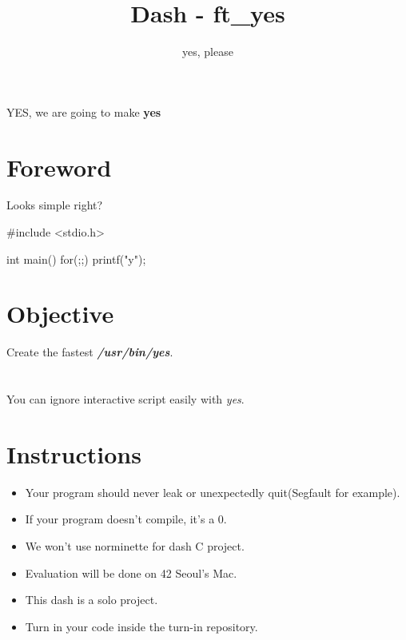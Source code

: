 \documentclass{42-en}
\begin{document}
\title{Dash - ft\_yes}
\subtitle{yes, please}


\summary
{
	YES, we are going to make \textbf{yes}
}

\maketitle

\tableofcontents


\chapter{Foreword}

Looks simple right?

\begin{42ccode}
#include <stdio.h>

int main()
{
	for(;;)
		printf("y\n");
}
\end{42ccode}


\chapter{Objective}
Create the fastest \textbf{\textit{/usr/bin/yes}}.\\\\\\
You can ignore interactive script easily with \textit{yes}.

\chapter{Instructions}

	\begin{itemize}

		\item Your program should never leak or unexpectedly quit(Segfault for example).
		\item If your program doesn’t compile, it’s a 0.
		\item We won't use norminette for dash C project.
		\item Evaluation will be done on 42 Seoul's Mac.
		\item This dash is a solo project.
		\item Turn in your code inside the turn-in repository.

	\end{itemize}
\end{document}
